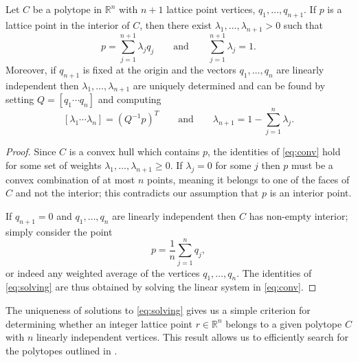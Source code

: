 \documentclass[oneside,hidelinks,indentfirst,10pt]{book}
\begin{document}
\begin{thm}\label{thm:posweights}
Let \(C\) be a polytope in \(\mathbb{R}^n\) with \(n+1\) lattice point vertices, \(q_1,\dots,q_{n+1}\). If \(p\) is a lattice point in the interior of \(C\), then there exist \(\lambda_1,\dots,\lambda_{n+1}>0\) such that
\begin{equation}\label{eq:conv}
    p=\sum_{j=1}^{n+1}\lambda_jq_j\qquad\textrm{and}\qquad\sum_{j=1}^{n+1}\lambda_j=1.
\end{equation}
Moreover, if \(q_{n+1}\) is fixed at the origin and the vectors \(q_1,\dots,q_n\) are linearly independent then \(\lambda_1,\dots,\lambda_{n+1}\) are uniquely determined and can be found by setting \(Q=[q_1 \cdots q_n]\) and computing
\begin{equation}\label{eq:solving}
    [\lambda_1\cdots\lambda_n]=(Q^{-1}p)^T\qquad\textrm{and}\qquad\lambda_{n+1}=1-\sum_{j=1}^n\lambda_j.
\end{equation}
\end{thm}


\begin{proof}
Since \(C\) is a convex hull which contains \(p\), the identities of \eqref{eq:conv} hold for some set of weights \(\lambda_1,\dots,\lambda_{n+1}\geq 0\). If \(\lambda_j=0\) for some \(j\) then \(p\) must be a convex combination of at most \(n\) points, meaning it belongs to one of the faces of \(C\) and not the interior; this contradicts our assumption that \(p\) is an interior point. 

If \(q_{n+1}=0\) and \(q_{1},\dots,q_n\) are linearly independent then \(C\) has non-empty interior; simply consider the point
\[
    p=\frac{1}{n}\sum_{j=1}^n q_j,
\]
or indeed any weighted average of the vertices \(q_1,\dots,q_n\). The identities of \eqref{eq:solving} are thus obtained by solving the linear system in \eqref{eq:conv}.
\end{proof}

The uniqueness of solutions to \eqref{eq:solving} gives us a simple criterion for determining whether an integer lattice point \(r\in\mathbb{R}^n\) belongs to a given polytope \(C\) with \(n\) linearly independent vertices. This result allows us to efficiently search for the polytopes outlined in .
\end{document}
